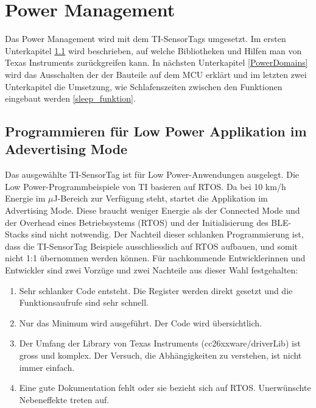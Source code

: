 

\section{Power Management}
\label{powerOptimierung}

Das Power Management wird mit dem TI-SensorTags umgesetzt. Im ersten Unterkapitel \ref{keinROTS} wird beschrieben, auf welche Bibliotheken und Hilfen man von Texas Instruments zurückgreifen kann. In nächsten Unterkapitel \ref{PowerDomains} wird das Ausschalten der der Bauteile auf dem MCU erklärt und im letzten zwei Unterkapitel die Umsetzung, wie Schlafenszeiten zwischen den Funktionen eingebaut werden \ref{sleep_funktion}.



\subsection{Programmieren für Low Power Applikation im Adevertising Mode}
\label{keinROTS}

Das ausgewählte TI-SensorTag ist für Low Power-Anwendungen ausgelegt. Die Low Power-Programmbeispiele von TI basieren auf RTOS. Da bei 10 km/h Energie im $\mu$J-Bereich zur Verfügung steht, startet die Applikation im Advertising Mode. Diese braucht weniger Energie als der Connected Mode und der Overhead eines Betriebsystems (RTOS) und der Initialisierung des BLE-Stacks sind nicht notwendig. Der Nachteil dieser schlanken Programmierung ist, dass die TI-SensorTag Beispiele ausschliesslich auf RTOS aufbauen, und somit nicht 1:1 übernommen werden können. Für nachkommende Entwicklerinnen und Entwickler sind zwei Vorzüge und zwei Nachteile aus dieser Wahl festgehalten:

\begin{minipage}{1\textwidth}
    \begin{enumerate}
        \item    Sehr schlanker Code entsteht. Die Register werden direkt gesetzt und die Funktionsaufrufe sind sehr schnell.
        \item  Nur das Minimum wird ausgeführt. Der Code wird übersichtlich.    
        \item Der Umfang der Library von Texas Instruments (cc26xxware/driverLib) ist gross und komplex. Der Versuch, die Abhängigkeiten zu verstehen, ist nicht immer einfach.
       \item Eine gute Dokumentation fehlt oder sie bezieht sich auf RTOS. Unerwünschte Nebeneffekte treten auf.
    \end{enumerate}
\end{minipage}

